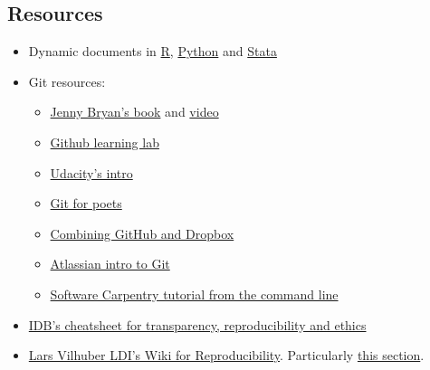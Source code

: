 \documentclass[]{book}
\providecommand{\tightlist}{%
  \setlength{\itemsep}{0pt}\setlength{\parskip}{0pt}}
\begin{document}
\hypertarget{resources}{%
\subsection{Resources}\label{resources}}

\begin{itemize}
\tightlist
\item
  Dynamic documents in \href{https://rmarkdown.rstudio.com/gallery.html}{R}, \href{https://github.com/jupyter/jupyter/wiki/A-gallery-of-interesting-Jupyter-Notebooks\#economics-and-finance}{Python} and \href{https://github.com/BITSS/CEGA2019/blob/master/03-extra_dynamic_docs/02b-Stata-markdown/Stata\%20Markdown.pdf}{Stata}\\
\item
  Git resources:

  \begin{itemize}
  \tightlist
  \item
    \href{https://happygitwithr.com}{Jenny Bryan's book} and \href{https://www.rstudio.com/resources/videos/happy-git-and-gihub-for-the-user-tutorial/}{video}\\
  \item
    \href{https://lab.github.com/}{Github learning lab}
  \item
    \href{https://www.udacity.com/course/how-to-use-git-and-github--ud775}{Udacity's intro}\\
  \item
    \href{https://www.youtube.com/playlist?list=PLRqwX-V7Uu6ZF9C0YMKuns9sLDzK6zoiV}{Git for poets}\\
  \item
    \href{https://github.com/kbjarkefur/GitHubDropBox}{Combining GitHub and Dropbox}\\
  \item
    \href{https://www.atlassian.com/git/tutorials}{Atlassian intro to Git}
  \item
    \href{https://swcarpentry.github.io/git-novice/}{Software Carpentry tutorial from the command line}
  \end{itemize}
\item
  \href{http://idbdocs.iadb.org/wsdocs/getdocument.aspx?docnum=EZSHARE-1350314980-383}{IDB's cheatsheet for transparency, reproducibility and ethics}\\
\item
  \href{https://github.com/labordynamicsinstitute/replicability-training/wiki}{Lars Vilhuber LDI's Wiki for Reproducibility}. Particularly \href{https://github.com/labordynamicsinstitute/replicability-training/wiki/Prepare_and_run_replication}{this section}.\\

\end{itemize}
\end{document}

